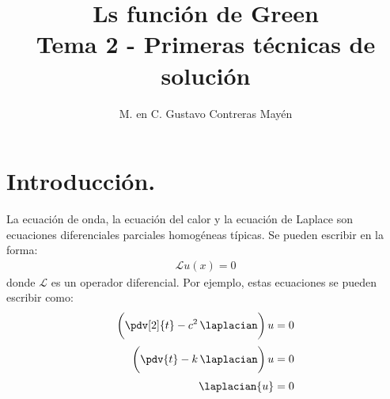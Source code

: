 
\title{Ls función de Green \\ \large {Tema 2 - Primeras técnicas de solución} \vspace{-3ex}}
\author{M. en C. Gustavo Contreras Mayén}
\date{ }

\pagestyle{fancy}
\fancyhf{}
\lhead{\leftmark}
\rfoot{\thepage}
\setlength{\headheight}{16pt}%


\vspace{-4cm}
\maketitle
\fontsize{14}{14}\selectfont
\tableofcontents
\newpage

\section{Introducción.}

La ecuación de onda, la ecuación del calor y la ecuación de Laplace son ecuaciones diferenciales parciales homogéneas típicas. Se pueden escribir en la forma:
\begin{align*}
\mathcal{L} u (x) = 0
\end{align*}
donde $\mathcal{L}$ es un operador diferencial. Por ejemplo, estas ecuaciones se pueden escribir como:
\begin{align*}
\bigg( \pdv[2]{t} - c^{2} \, \laplacian \bigg) \, u &= 0 \\[0.25em]
\bigg( \pdv{t} - k \, \laplacian \bigg) \, u &= 0 \\[0.25em]
\laplacian{u} &= 0
\end{align*}

